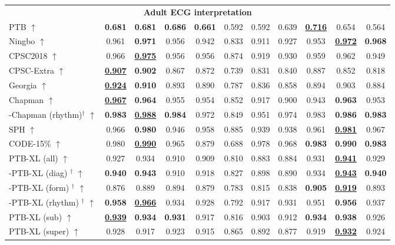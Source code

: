 \documentclass{article}
\begin{document}
\begin{table}[t]
\begin{tabular}{lcccccccccc}
                    \multicolumn{11}{c}{\textbf{Adult ECG interpretation }} \\
                    PTB $\uparrow$ & \textbf{0.681} & \textbf{0.681} & \textbf{0.686} & \textbf{0.661} & 0.592 & 0.592 & 0.639 & \underline{\textbf{0.716}} & 0.654 & 0.564 \\
                    Ningbo $\uparrow$ & 0.961 & \textbf{0.971} & 0.956 & 0.942 & 0.833 & 0.911 & 0.927 & 0.953 & \underline{\textbf{0.972}} & \textbf{0.968} \\
                    CPSC2018 $\uparrow$ & 0.966 & \underline{\textbf{0.975}} & 0.956 & 0.956 & 0.874 & 0.919 & 0.930 &  0.959 & 0.962 & 0.949 \\
                    CPSC-Extra $\uparrow$ & \underline{\textbf{0.907}} & \textbf{0.902} & 0.867 & 0.872 & 0.739 &0.831  & 0.840 &  0.887 & 0.852 & 0.818 \\
                    Georgia $\uparrow$ & \underline{\textbf{0.924}} & \textbf{0.910} & 0.893 & 0.890 & 0.787 & 0.836 & 0.858 &  0.894 & 0.903 & 0.884 \\
                    Chapman $\uparrow$ & \underline{\textbf{0.967}} & \textbf{0.964} & 0.955 & 0.954 & 0.852 & 0.917 & 0.900 & 0.943 & \textbf{0.963} & 0.953 \\
                    -Chapman (rhythm)${}^\dagger$ $\uparrow$ & \textbf{0.983} & \underline{\textbf{0.988}} & \textbf{0.984} & 0.972 & 0.849 & 0.951 & 0.974 & 0.983 & \textbf{0.986} & \textbf{0.983} \\
                    SPH $\uparrow$ & 0.966 & \textbf{0.980} & 0.946 & 0.958 & 0.885 & 0.939 & 0.938 & 0.961 & \underline{\textbf{0.981}} & 0.967 \\
                    CODE-15\% $\uparrow$ & 0.980 & \underline{\textbf{0.990}} & 0.965 & 0.879 & 0.688 & 0.978 & 0.968 & \textbf{0.983} & \textbf{0.990} & \textbf{0.983} \\
                    PTB-XL (all) $\uparrow$ & 0.927 & 0.934 & 0.910 & 0.909 & 0.810 & 0.883 & 0.884 & 0.931 & \underline{\textbf{0.941}} & 0.929 \\
                    -PTB-XL (diag) ${}^\dagger$ $\uparrow$ & \textbf{0.940} & \textbf{0.943} & 0.910 & 0.918 & 0.827 & 0.898 & 0.890 & 0.934 & \underline{\textbf{0.943}} & \textbf{0.940} \\
                    -PTB-XL (form) ${}^\dagger$ $\uparrow$ & 0.876 & 0.889 & 0.894 & 0.879 & 0.783 & 0.815 & 0.838 & \textbf{0.905} & \underline{\textbf{0.919}} & 0.893 \\
                    -PTB-XL (rhythm) ${}^\dagger$ $\uparrow$ & \textbf{0.958} & \underline{\textbf{0.966}} & 0.934 & 0.928 & 0.792 & 0.917 & 0.931 & 0.951 &  \textbf{0.956} & 0.937 \\
                    PTB-XL (sub) $\uparrow$ & \underline{\textbf{0.939}} & \textbf{0.934} & \textbf{0.931} & 0.917 & 0.816 & 0.903 & 0.912 & \textbf{0.934} &\textbf{0.938} & 0.926 \\
                    PTB-XL (super) $\uparrow$ & 0.928 & 0.917 & 0.923 & 0.915 & 0.865 & 0.892 & 0.877 &  0.919 & \underline{\textbf{0.932}} & 0.924 \\
                    \midrule
        

\end{tabular}
\end{table}
\end{document}
